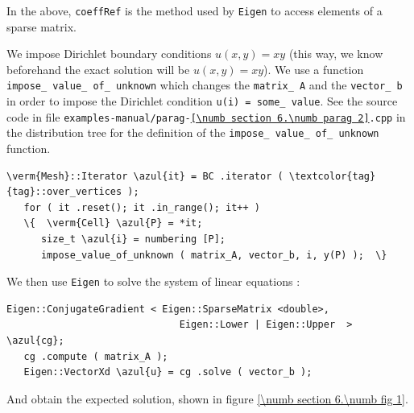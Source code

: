 In the above, {\small\tt coeffRef} is the method used by {\small\tt Eigen} to access elements of
a sparse matrix.

We impose Dirichlet boundary conditions $ u(x,y) = xy $ (this way, we know beforehand
the exact solution will be $ u(x,y) = xy $).
We use a function {\small\tt impose\_\,value\_\,of\_\,unknown} which changes the {\small\tt matrix\_\,A}
and the {\small\tt vector\_\,b} in order to impose the Dirichlet condition {\small\tt u(i) = 
some\_\,value}.
See the source code in file {\small\tt examples-manual/parag-\ref{\numb section 6.\numb parag 2}.cpp}
in the distribution tree for the definition of the {\small\tt impose\_\,value\_\,of\_\,unknown}
function.

\begin{Verbatim}[commandchars=\\\{\},formatcom=\small\tt,frame=single,
   label=parag-\ref{\numb section 6.\numb parag 2}.cpp,rulecolor=\color{moldura},
   baselinestretch=0.94,framesep=2mm                                            ]
   \verm{Mesh}::Iterator \azul{it} = BC .iterator ( \textcolor{tag}{tag}::over_vertices );
   for ( it .reset(); it .in_range(); it++ )
   \{  \verm{Cell} \azul{P} = *it;
      size_t \azul{i} = numbering [P];
      impose_value_of_unknown ( matrix_A, vector_b, i, y(P) );  \}
\end{Verbatim}
\vfil\eject

We then use {\small\tt Eigen} to solve the system of linear equations :

\begin{Verbatim}[commandchars=\\\{\},formatcom=\small\tt,frame=single,
   label=parag-\ref{\numb section 6.\numb parag 2}.cpp,rulecolor=\color{moldura},
   baselinestretch=0.94,framesep=2mm                                            ]
   Eigen::ConjugateGradient < Eigen::SparseMatrix <double>,
                              Eigen::Lower | Eigen::Upper  > \azul{cg};
   cg .compute ( matrix_A );
   Eigen::VectorXd \azul{u} = cg .solve ( vector_b );
\end{Verbatim}

And obtain the expected solution, shown in figure \ref{\numb section 6.\numb fig 1}.

